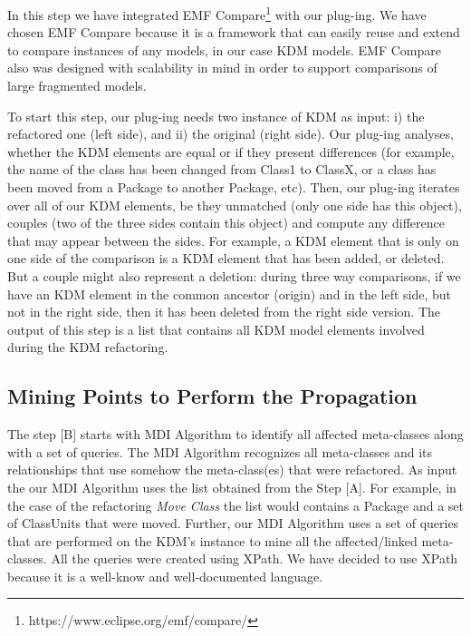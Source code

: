 
In this step we have integrated  EMF Compare\footnote{https://www.eclipse.org/emf/compare/} with our plug-ing. We have chosen EMF Compare because it is a framework that can easily reuse and extend to compare instances of any models, in our case KDM models. EMF Compare also was designed with scalability in mind in order to support comparisons of large fragmented models.

To start this step, our plug-ing needs two instance of KDM as input: i) the refactored one (left side), and ii) the original (right side). Our plug-ing analyses, whether the KDM elements are equal or if they present differences (for example, the name of the class has been changed from Class1 to ClassX, or a class has been moved from a Package to another Package, etc). Then, our plug-ing iterates over all of our KDM elements, be they unmatched (only one side has this object), couples (two of the three sides contain this object) and compute any difference that may appear between the sides. 
For example, a KDM element that is only on one side of the comparison is a KDM element that has been added, or deleted. But a couple might also represent a deletion: during three way comparisons, if we have an KDM element in the common ancestor (origin) and in the left side, but not in the right side, then it has been deleted from the right side version. The output of this step is a list that contains all KDM model elements involved during the KDM refactoring. 

\subsection{Mining Points to Perform the Propagation} %
\label{sub:mine_affected_metaclasses}

The step [B] starts with MDI Algorithm to identify all affected meta-classes along with a set of queries. The MDI Algorithm recognizes all meta-classes and its relationships that use somehow the meta-class(es) that were refactored. As input the our MDI Algorithm uses the list obtained from the Step [A]. For example, in the case of the refactoring \textit{Move Class} the list would contains a Package and a set of ClassUnits that were moved. Further, our MDI Algorithm uses a set of queries that are performed on the KDM's instance to mine all the affected/linked meta-classes. All the queries were created using XPath. We have decided to use XPath because it is a well-know and well-documented language. 

